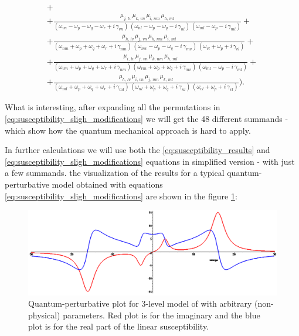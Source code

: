 \documentclass[12pt,twoside,a4paper]{article}
\numberwithin{equation}{subsection}
\numberwithin{figure}{subsection}
\begin{document}
\begin{subequations}
\begin{alignat*}{1}
+\\ +\frac {{\mu_{j,\,lv}}\,{\mu_{k,\,vn}}\,{\mu_{i,\,nm}}\,{\mu_{h,\,ml}}}
     {({\omega_{vn}} - {\omega_{p}} - {\omega_{q}} - {\omega_{r}} + i\,{\gamma_{vn}})\,
      ({\omega_{nl}} - {\omega_{p}} - {\omega_{q}} - i\,{\gamma_{nl}})\,
      ({\omega_{ml}} - {\omega_{p}} - i\,{\gamma_{ml}})} 
+\\ +\frac {{\mu_{h,\,lv}}\,{\mu_{j,\,vn}}\,{\mu_{k,\,nm}}\,{\mu_{i,\,ml}}}
     {({\omega_{nm}} + {\omega_{p}} + {\omega_{q}} + {\omega_{r}} + i\,{\gamma_{nm}})\,
      ({\omega_{mv}} - {\omega_{p}} - {\omega_{q}} - i\,{\gamma_{mv}})\,
      ({\omega_{vl}} + {\omega_{p}} + i\,{\gamma_{vl}})} 
+\\ +\frac {{\mu_{i,\,lv}}\,{\mu_{j,\,vn}}\,{\mu_{k,\,nm}}\,{\mu_{h,\,ml}}}
     {({\omega_{vm}} + {\omega_{p}} + {\omega_{q}} + {\omega_{r}} + i\,{\gamma_{nm}})\,
      ({\omega_{vm}} + {\omega_{p}} + {\omega_{q}} + i\,{\gamma_{mv}})\,
      ({\omega_{ml}} - {\omega_{p}} - i\,{\gamma_{ml}})} 
+\\ +\frac {{\mu_{h, \,lv}}\,{\mu_{i,\,vn}}\,{\mu_{j,\,mn}}\,{\mu_{k,\,ml}}}
     {({\omega_{ml}} + {\omega_{p}} + {\omega_{q}} + {\omega_{r}} + i\,{\gamma_{ml}})\,
      ({\omega_{nl}} + {\omega_{p}} + {\omega_{q}} + i\,{\gamma_{nl}})\,
      ({\omega_{vl}} + {\omega_{p}} + i\,{\gamma_{vl}})}).
  \end{alignat*}
\end{subequations}

What is interesting, after expanding all the permutations in \ref{eq:susceptibility_sligh_modifications} we will get the 48 different
summands - which show how the quantum mechanical approach is hard to apply.

In further calculations we will use both the \ref{eq:susceptibility_results} and \ref{eq:susceptibility_sligh_modifications}
equations in simplified version - with just a few summands. the visualization of the results for a typical quantum-perturbative model
obtained with equations \ref{eq:susceptibility_sligh_modifications} are shown in the figure \ref{fig:qp_plot}:

\begin{figure}
	\includegraphics[width=150mm]{img/qp_plot.png}
	\caption{Quantum-perturbative plot for 3-level model of with arbitrary (non-physical) parameters. Red plot is for the imaginary and the
	blue plot is for the real part of the linear susceptibility. \label{fig:qp_plot}}
\end{figure}
\end{document}
